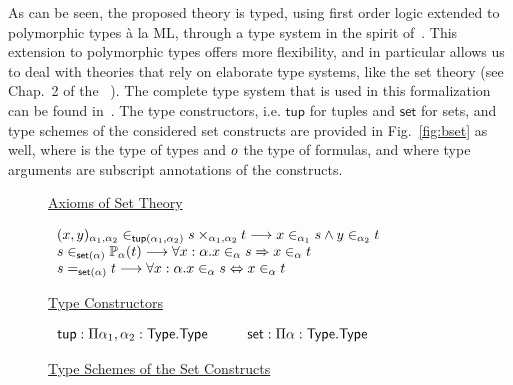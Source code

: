 As can be seen, the proposed theory is typed, using first order logic extended
to polymorphic types à la ML, through a type system in the spirit
of~\cite{BP13}. This extension to polymorphic types offers more flexibility, and
in particular allows us to deal with theories that rely on elaborate type
systems, like the \bmth{} set theory (see Chap.~2 of the
\bbook{}~\cite{B-Book}). The complete type system that is used in this
formalization can be found in~\cite{BA15}. The type constructors,
i.e. $\mathsf{tup}$ for tuples and $\mathsf{set}$ for sets, and type schemes of
the considered set constructs are provided in Fig.~\ref{fig:bset} as well, where
\type{} is the type of types and $o$ the type of formulas, and where type
arguments are subscript annotations of the constructs.

\begin{figure}[t]
\small
\hspace{0.2cm}\underline{Axioms of Set Theory}
\begin{flushleft}
$\begin{array}{@{\hspace{0.2cm}}l}
(x,y)_{\alpha_1,\alpha_2}\in_{\tuple{\alpha_1}{\alpha_2}}s\times_{\alpha_1,\alpha_2}t\rew
x\in_{\alpha_1}s\land{}y\in_{\alpha_2}t\\
s\in_{\set{\alpha}}\mathbb{P}_\alpha(t)\rew
\forall{}x:\alpha.x\in_\alpha{}s\Rightarrow{}x\in_\alpha{}t\\
s=_{\set{\alpha}}t\rew
\forall{}x:\alpha.x\in_\alpha{}s\Leftrightarrow{}x\in_\alpha{}t
\end{array}$
\end{flushleft}
\hspace{0.2cm}\underline{Type Constructors}
\begin{flushleft}
$\begin{array}{@{\hspace{0.2cm}}l@{\hspace{1.0cm}}l}
\mathsf{tup}:\Pi\alpha_1,\alpha_2:\type.\type &
\mathsf{set}:\Pi\alpha:\type.\type
\end{array}$
\end{flushleft}
\hspace{0.2cm}\underline{Type Schemes of the Set Constructs}
\end{figure}
